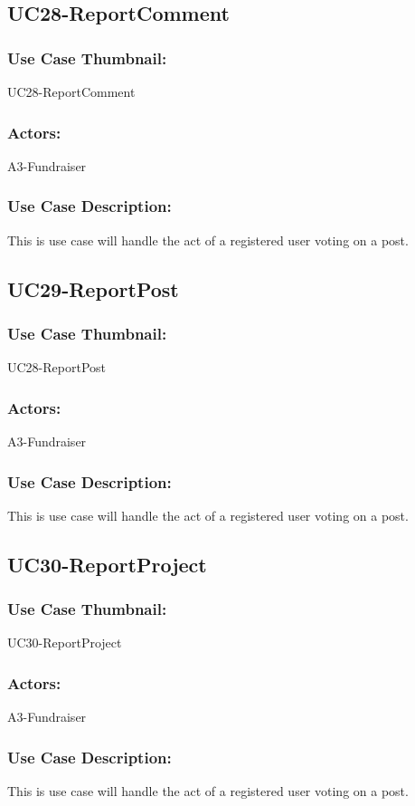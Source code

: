 \documentclass[11pt, openany]{report}
\begin{document}
\subsection{UC28-ReportComment}
\label{sUC28}
\subsubsection*{Use Case Thumbnail:}
UC28-ReportComment
\subsubsection*{Actors:}
A3-Fundraiser
\subsubsection*{Use Case Description:}
This is use case will handle the act of a registered user voting on a post.

\subsection{UC29-ReportPost}
\label{sUC29}
\subsubsection*{Use Case Thumbnail:}
UC28-ReportPost
\subsubsection*{Actors:}
A3-Fundraiser
\subsubsection*{Use Case Description:}
This is use case will handle the act of a registered user voting on a post.


\subsection{UC30-ReportProject}
\label{sUC30}
\subsubsection*{Use Case Thumbnail:}
UC30-ReportProject
\subsubsection*{Actors:}
A3-Fundraiser
\subsubsection*{Use Case Description:}
This is use case will handle the act of a registered user voting on a post.
\end{document}
